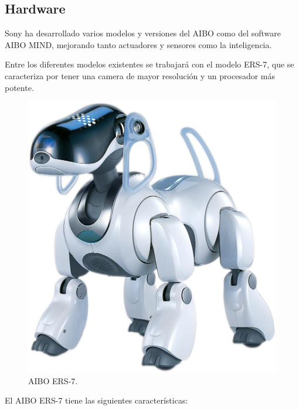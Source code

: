\documentclass[12pt,a4paper,final,twoside]{article}
\begin{document}
\subsection{Hardware}
Sony ha desarrollado varios modelos y versiones del AIBO como del software AIBO MIND, mejorando tanto actuadores y sensores como la inteligencia.

Entre los diferentes modelos existentes se trabajará con el modelo ERS-7, que se caracteriza por tener una camera de mayor resolución y un procesador más potente.

\begin{figure}[h!]
	\centering
    \includegraphics[scale=0.1]	{images/ers7lrg}
	 \caption{AIBO ERS-7.}
  \label{fig:ers7}
\end{figure}	

El AIBO ERS-7 tiene las siguientes características: 
\end{document}
